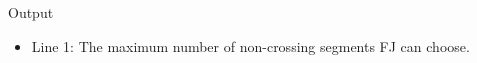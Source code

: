 Output
\begin{itemize}
	\item      Line 1: The maximum number of non-crossing segments FJ can choose.    
\end{itemize}